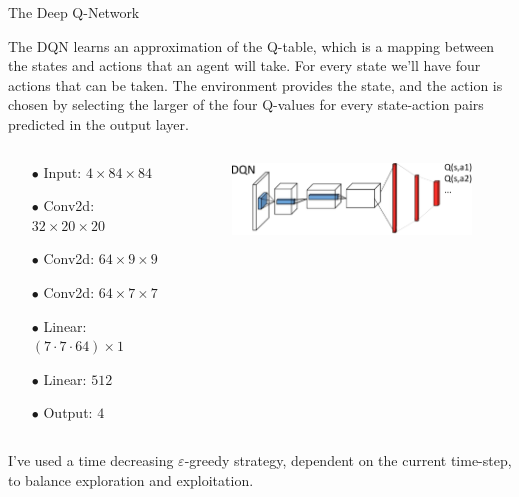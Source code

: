 \documentclass[10pt, aspectratio=169, compress, protectframetitle, handout]{beamer}
\begin{document}
\begin{frame}{The Deep Q-Network}
    
    
    The DQN learns an approximation of the Q-table, which is a mapping between the states and actions that an agent will take. For every state we'll have four actions that can be taken. The environment provides the state, and the action is chosen by selecting the larger of the four Q-values for every state-action pairs predicted in the output layer.
    
    \begin{columns}[onlytextwidth]
        \begin{column}{.4\textwidth}
            \begin{itemize}[itemsep=0pt]
                \item[\alert{$\bullet$}] Input: $4 \times 84 \times 84$
                \item[\alert{$\bullet$}] Conv2d: $32 \times 20 \times 20$
                \item[\alert{$\bullet$}] Conv2d: $64 \times 9 \times 9$
                \item[\alert{$\bullet$}] Conv2d: $64 \times 7 \times 7$
                \item[\alert{$\bullet$}] Linear: $(7 \cdot 7 \cdot 64) \times 1$
                \item[\alert{$\bullet$}] Linear: $512$
                \item[\alert{$\bullet$}] Output: $4$
            \end{itemize}
        \end{column}
        
        \begin{column}{.6\textwidth}
            \begin{figure}
                \centering
                \includegraphics[width=7cm]{figures/DQN.png}
            \end{figure}
        \end{column}
    \end{columns}
    \medskip
    
    I've used a time decreasing $\varepsilon$-greedy strategy, dependent on the current time-step, to balance exploration and  exploitation.
    
\end{frame}
\end{document}
